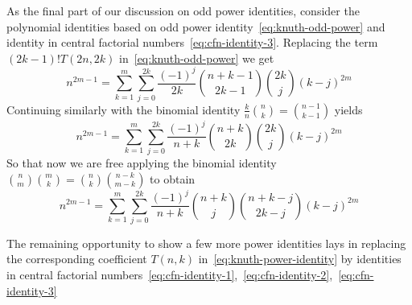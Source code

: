 As the final part of our discussion on odd power identities,
consider the polynomial identities based on odd power identity~\eqref{eq:knuth-odd-power}
and identity in central factorial numbers~\eqref{eq:cfn-identity-3}.
Replacing the term $(2k-1)!T(2n, 2k)$ in~\eqref{eq:knuth-odd-power} we get
\begin{equation*}
    n^{2m-1} = \sum_{k=1}^{m} \sum_{j=0}^{2k} \frac{(-1)^{j}}{2k} \binom{n+k-1}{2k-1} \binom{2k}{j} (k-j)^{2m}
\end{equation*}
Continuing similarly with the binomial identity $\frac{k}{n} \binom{n}{k} = \binom{n-1}{k-1}$ yields
\begin{equation*}
    n^{2m-1} = \sum_{k=1}^{m} \sum_{j=0}^{2k} \frac{(-1)^{j}}{n+k} \binom{n+k}{2k} \binom{2k}{j} (k-j)^{2m}
\end{equation*}
So that now we are free applying the binomial identity $\binom{n}{m} \binom{m}{k} = \binom{n}{k} \binom{n-k}{m-k}$
to obtain
\begin{equation*}
    n^{2m-1} = \sum_{k=1}^{m} \sum_{j=0}^{2k} \frac{(-1)^{j}}{n+k} \binom{n+k}{j} \binom{n+k-j}{2k-j} (k-j)^{2m}
\end{equation*}

The remaining opportunity to show a few more power identities lays in replacing the corresponding coefficient $T(n,k)$
in~\eqref{eq:knuth-power-identity} by identities
in central factorial numbers~\eqref{eq:cfn-identity-1},~\eqref{eq:cfn-identity-2},~\eqref{eq:cfn-identity-3}